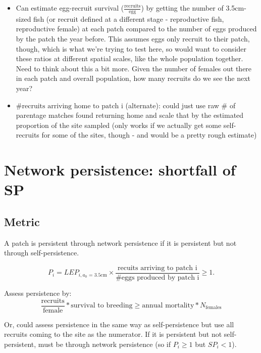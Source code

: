 \documentclass[12pt, oneside]{article}   	%
\begin{document}
\begin{itemize}
\item Can estimate egg-recruit survival ($\frac{\text{recruits}}{\text{egg}}$) by getting the number of 3.5cm-sized fish (or recruit defined at a different stage - reproductive fish, reproductive female) at each patch compared to the number of eggs produced by the patch the year before. This assumes eggs only recruit to their patch, though, which is what we're trying to test here, so would want to consider these ratios at different spatial scales, like the whole population together. Need to think about this a bit more. Given the number of females out there in each patch and overall population, how many recruits do we see the next year?
\item $\# \text{recruits arriving home to patch i}$ (alternate): could just use raw \# of parentage matches found returning home and scale that by the estimated proportion of the site sampled (only works if we actually get some self-recruits for some of the sites, though - and would be a pretty rough estimate)
\end{itemize}

\section*{Network persistence: shortfall of SP}
\subsection*{Metric}
A patch is persistent through network persistence if it is persistent but not through self-persistence.

\begin{equation}
P_i = LEP_{i, \text{$a_0$ = 3.5cm}} \times \frac{\text{recuits arriving to patch i}}{\# \text{eggs produced by patch i}} \geq 1. %
\end{equation}

Assess persistence by:
\begin{equation}
\frac{\text{recruits}}{\text{female}}*\text{survival to breeding} \geq \text{annual mortality}*N_{\text{females}}
\end{equation}

Or, could assess persistence in the same way as self-persistence but use all recruits coming to the site as the numerator. If it is persistent but not self-persistent, must be through network persistence (so if $P_i \geq 1$ but $SP_i < 1$).
\end{document}
